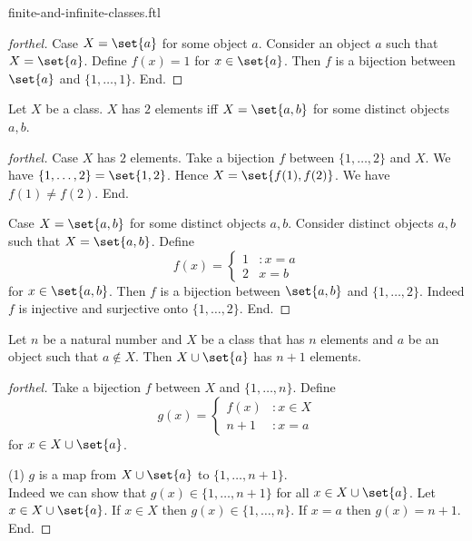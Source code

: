 \documentclass{naproche-library}
\begin{document}
\begin{smodule}{finite-and-infinite-classes.ftl}
\begin{proof}[forthel]
    Case $X = \set{a}$ for some object $a$.
      Consider an object $a$ such that $X = \set{a}$.
      Define $f(x) = 1$ for $x \in \set{a}$.
    Then $f$ is a bijection between $\set{a}$ and $\{ 1, \dots, 1 \}$.
    End.
  \end{proof}

  \begin{proposition}[forthel,id=FOUNDATIONS_14_3468912675458910,printid]
    Let $X$ be a class.
    $X$ has $2$ elements iff $X = \set{a, b}$ for some distinct objects $a, b$.
  \end{proposition}
  \begin{proof}[forthel]
    Case $X$ has $2$ elements.
      Take a bijection $f$ between $\{ 1, \dots, 2 \}$ and $X$.
      We have $\{ 1, \dots, 2 \} = \set{1, 2}$.
      Hence $X = \set{f(1), f(2)}$.
      We have $f(1) \neq f(2)$.
    End.

    Case $X = \set{a, b}$ for some distinct objects $a, b$.
      Consider distinct objects $a, b$ such that $X = \set{a, b}$.
      Define \[f(x) =
        \begin{cases}
          1 & : x = a \\
          2 & x = b
        \end{cases}\]
      for $x \in \set{a, b}$.
      Then $f$ is a bijection between $\set{a, b}$ and $\{ 1, \dots, 2 \}$.
      Indeed $f$ is injective and surjective onto $\{ 1, \dots, 2 \}$.
    End.
  \end{proof}

  \begin{proposition}[forthel,id=FOUNDATIONS_14_0615204230800975,printid]
    Let $n$ be a natural number and $X$ be a class that has $n$ elements and $a$ be an object such that $a \notin X$.
    Then $X \cup \set{a}$ has $n + 1$ elements.
  \end{proposition}
  \begin{proof}[forthel]
    Take a bijection $f$ between $X$ and $\{ 1, \dots, n \}$.
    Define \[g(x) =
      \begin{cases}
        f(x)  & : x \in X \\
        n + 1 & : x = a
      \end{cases}\]
    for $x \in X \cup \set{a}$.

    (1) $g$ is a map from $X \cup \set{a}$ to $\{ 1, \dots, n + 1 \}$. \\
    Indeed we can show that $g(x) \in \{ 1, \dots, n + 1 \}$ for all $x \in X \cup \set{a}$.
      Let $x \in X \cup \set{a}$.
      If $x \in X$ then $g(x) \in \{ 1, \dots, n \}$.
      If $x = a$ then $g(x) = n + 1$.
    End.


\end{proof}
\end{smodule}
\end{document}
